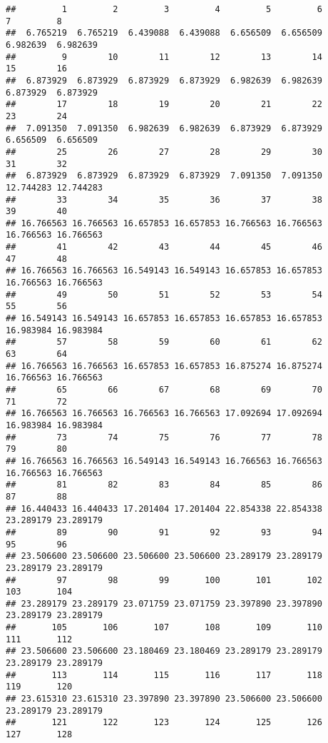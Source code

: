 \documentclass[
]{article}
\begin{document}
\begin{verbatim}
##         1         2         3         4         5         6         7         8 
##  6.765219  6.765219  6.439088  6.439088  6.656509  6.656509  6.982639  6.982639 
##         9        10        11        12        13        14        15        16 
##  6.873929  6.873929  6.873929  6.873929  6.982639  6.982639  6.873929  6.873929 
##        17        18        19        20        21        22        23        24 
##  7.091350  7.091350  6.982639  6.982639  6.873929  6.873929  6.656509  6.656509 
##        25        26        27        28        29        30        31        32 
##  6.873929  6.873929  6.873929  6.873929  7.091350  7.091350 12.744283 12.744283 
##        33        34        35        36        37        38        39        40 
## 16.766563 16.766563 16.657853 16.657853 16.766563 16.766563 16.766563 16.766563 
##        41        42        43        44        45        46        47        48 
## 16.766563 16.766563 16.549143 16.549143 16.657853 16.657853 16.766563 16.766563 
##        49        50        51        52        53        54        55        56 
## 16.549143 16.549143 16.657853 16.657853 16.657853 16.657853 16.983984 16.983984 
##        57        58        59        60        61        62        63        64 
## 16.766563 16.766563 16.657853 16.657853 16.875274 16.875274 16.766563 16.766563 
##        65        66        67        68        69        70        71        72 
## 16.766563 16.766563 16.766563 16.766563 17.092694 17.092694 16.983984 16.983984 
##        73        74        75        76        77        78        79        80 
## 16.766563 16.766563 16.549143 16.549143 16.766563 16.766563 16.766563 16.766563 
##        81        82        83        84        85        86        87        88 
## 16.440433 16.440433 17.201404 17.201404 22.854338 22.854338 23.289179 23.289179 
##        89        90        91        92        93        94        95        96 
## 23.506600 23.506600 23.506600 23.506600 23.289179 23.289179 23.289179 23.289179 
##        97        98        99       100       101       102       103       104 
## 23.289179 23.289179 23.071759 23.071759 23.397890 23.397890 23.289179 23.289179 
##       105       106       107       108       109       110       111       112 
## 23.506600 23.506600 23.180469 23.180469 23.289179 23.289179 23.289179 23.289179 
##       113       114       115       116       117       118       119       120 
## 23.615310 23.615310 23.397890 23.397890 23.506600 23.506600 23.289179 23.289179 
##       121       122       123       124       125       126       127       128 

\end{verbatim}
\end{document}
